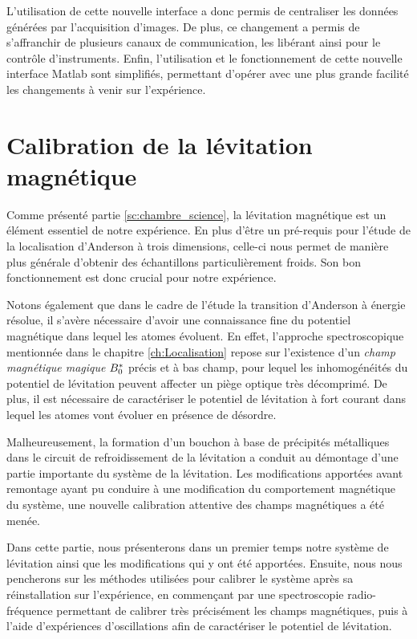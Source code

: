 L'utilisation de cette nouvelle interface a donc permis de centraliser les données générées par l'acquisition d'images. De plus, ce changement a permis de s'affranchir de plusieurs canaux de communication, les libérant ainsi pour le contrôle d'instruments. Enfin, l'utilisation et le fonctionnement de cette nouvelle interface Matlab sont simplifiés, permettant d'opérer avec une plus grande facilité les changements à venir sur l'expérience.











\section{Calibration de la lévitation magnétique}
\label{sc:levitation}
Comme présenté partie \ref{sc:chambre_science}, la lévitation magnétique est un élément essentiel de notre expérience. En plus d'être un pré-requis pour l'étude de la localisation d'Anderson à trois dimensions, celle-ci nous permet de manière plus générale d'obtenir des échantillons particulièrement froids. Son bon fonctionnement est donc crucial pour notre expérience. 

Notons également que dans le cadre de l'étude la transition d'Anderson à énergie résolue, il s'avère nécessaire d'avoir une connaissance fine du potentiel magnétique dans lequel les atomes évoluent. En effet, l'approche spectroscopique mentionnée dans le chapitre \ref{ch:Localisation} repose sur l'existence d'un \emph{champ magnétique magique} $B_0^*$ précis et à bas champ, pour lequel les inhomogénéités du potentiel de lévitation peuvent affecter un piège optique très décomprimé. De plus, il est nécessaire de caractériser le potentiel de lévitation à fort courant dans lequel les atomes vont évoluer en présence de désordre.%

Malheureusement, la formation d'un bouchon à base de précipités métalliques dans le circuit de refroidissement de la lévitation a conduit au démontage d'une partie importante du système de la lévitation. Les modifications apportées avant remontage ayant pu conduire à une modification du comportement magnétique du système, une nouvelle calibration attentive des champs magnétiques a été menée.

Dans cette partie, nous présenterons dans un premier temps notre système de lévitation ainsi que les modifications qui y ont été apportées. Ensuite, nous nous pencherons sur les méthodes utilisées pour calibrer le système après sa réinstallation sur l'expérience, en commençant par  une spectroscopie radio-fréquence permettant de calibrer très précisément les champs magnétiques, puis à l'aide d'expériences d'oscillations afin de caractériser le potentiel de lévitation.




